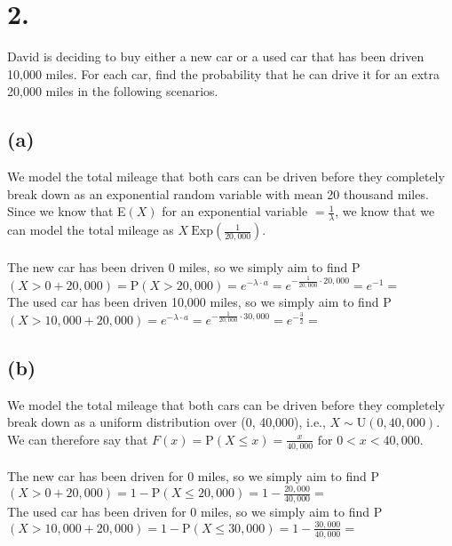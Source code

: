\documentclass{article}
\begin{document}
\section*{2.}
{\Large

David is deciding to buy either a new car or a used car that has been driven 10,000 miles. For
each car, find the probability that he can drive it for an extra 20,000 miles in the following
scenarios.

\subsection*{(a)}
We model the total mileage that both cars can be driven before they completely break down as an
exponential random variable with mean 20 thousand miles. Since we know that E$(X)$ for an exponential variable $= \frac{1}{\lambda}$, we know that we can model the total mileage as $X ~ \text{Exp}(\frac{1}{20,000})$. \\ \\ 
The new car has been driven 0 miles, so we simply aim to find P$(X > 0 + 20,000) = \text{P}(X > 20,000) = e^{-\lambda \cdot a} = e^{-\frac{1}{20,000} \cdot 20,000} = e^{-1} = $  \\
The used car has been driven 10,000 miles, so we simply aim to find P$(X > 10,000 + 20,000) = e^{-\lambda \cdot a} = e^{-\frac{1}{20,000} \cdot 30,000} = e^{-\frac{3}{2}} = $  \\ 

\subsection*{(b)}
We model the total mileage that both cars can be driven before they completely break down as a uniform distribution over (0, 40,000), i.e., $X \sim \text{U}(0, 40,000)$. We can therefore say that $F(x) = \text{P}(X \leq x) = \frac{x}{40,000} \text{ for } 0 < x < 40,000$. \\ \\
The new car has been driven for 0 miles, so we simply aim to find P$(X > 0 + 20,000) = 1 - \text{P}(X \leq 20,000) = 1 - \frac{20,000}{40,000} = $  \\ 
The used car has been driven for 0 miles, so we simply aim to find P$(X > 10,000 + 20,000) = 1 - \text{P}(X \leq 30,000) = 1 - \frac{30,000}{40,000} = $ 

}
\end{document}
